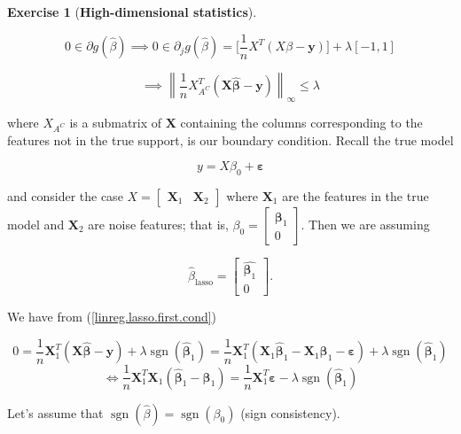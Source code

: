 \documentclass{article}
\theoremstyle{definition}
\newtheorem{exercise}{Exercise}
\theoremstyle{definition}
\theoremstyle{definition}
\theoremstyle{definition}
\renewcommand{\epsilon}{\varepsilon}
\renewcommand{\epsilon}{\varepsilon}
\begin{document}
\begin{exercise}[\textbf{High-dimensional statistics}]
\begin{enumerate}[(a)]
\[
0 \in \partial g(\hat{\beta}) \implies 0 \in \partial_j g(\hat{\beta}) = \bigg[ \frac{1}{n}X^T(X \beta - \boldsymbol{y}) \bigg] + \lambda [-1, 1]
\]

\begin{equation}\label{linreg.lasso.bound.cond}
\implies \left\lVert \frac{1}{n} X_{A^C}^T (\boldsymbol{X} \boldsymbol{\hat{\beta}} - \boldsymbol{y}) \right\rVert_\infty \leq \lambda
\end{equation}

where \(X_{A^C}\) is a submatrix of \(\boldsymbol{X}\) containing the columns corresponding to the features not in the true support, is our boundary condition. Recall the true model

\[
y = X \beta_0 + \boldsymbol{\epsilon}
\]

and consider the case \(X = \begin{bmatrix}\boldsymbol{X}_1 & \boldsymbol{X}_2 \end{bmatrix}\) where \(\boldsymbol{X}_1\) are the features in the true model and \(\boldsymbol{X}_2\) are noise features; that is, \(\beta_0 = \begin{bmatrix} \boldsymbol{\beta}_1 \\ 0 \end{bmatrix}\). Then we are assuming

\[
\hat{\beta}_{\text{lasso}} = \begin{bmatrix} \hat{\boldsymbol{\beta}_1} \\ 0 \end{bmatrix}.
\]

We have from (\ref{linreg.lasso.first.cond})

\[
0 = \frac{1}{n} \boldsymbol{X}_1^T(\boldsymbol{X} \boldsymbol{\hat{\beta}} - \boldsymbol{y}) + \lambda  \operatorname{sgn}(\boldsymbol{\hat{\beta}}_1) = \frac{1}{n} \boldsymbol{X}_1^T(\boldsymbol{X}_1 \boldsymbol{\hat{\beta}}_1 - \boldsymbol{X}_1 \boldsymbol{\beta}_1 - \boldsymbol{\epsilon}) + \lambda  \operatorname{sgn}(\boldsymbol{\hat{\beta}}_1) 
\]
\[
 \iff \frac{1}{n} \boldsymbol{X}_1^T\boldsymbol{X}_1 (\boldsymbol{\hat{\beta}}_1 - \boldsymbol{\beta}_1)  =  \frac{1}{n} \boldsymbol{X}_1^T \boldsymbol{\epsilon} - \lambda  \operatorname{sgn}(\boldsymbol{\hat{\beta}}_1)
 \]
 
 Let's assume that \(\operatorname{sgn}(\hat{\beta}) = \operatorname{sgn}(\beta_0)\) (sign consistency).
 

\end{enumerate}
\end{exercise}
\end{document}
